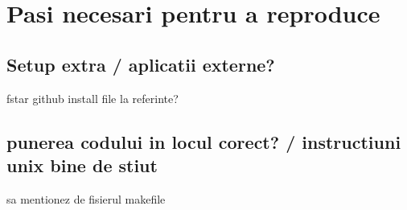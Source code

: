 \chapter{Pasi necesari pentru a reproduce}



\section{Setup extra / aplicatii externe?}

fstar github install file la referinte?

\section{punerea codului in locul corect? / instructiuni unix bine de stiut}

sa mentionez de fisierul makefile 